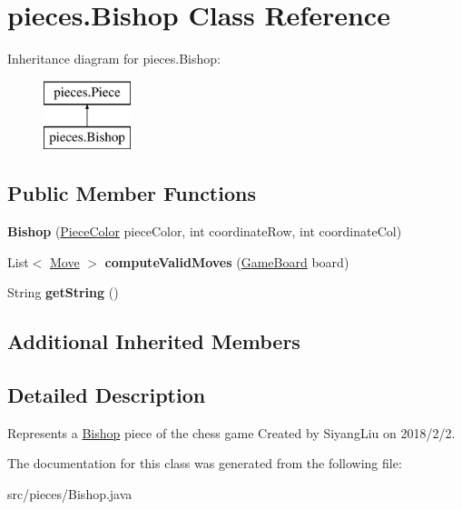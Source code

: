 \hypertarget{classpieces_1_1_bishop}{}\section{pieces.\+Bishop Class Reference}
\label{classpieces_1_1_bishop}
Inheritance diagram for pieces.\+Bishop\+:\begin{figure}[H]
\begin{center}
\leavevmode
\includegraphics[height=2.000000cm]{classpieces_1_1_bishop}
\end{center}
\end{figure}
\subsection*{Public Member Functions}
\begin{DoxyCompactItemize}
\item 
\mbox{\label{classpieces_1_1_bishop_ab1dc4c94ace53398203ed123aeb96a14}} 
{\bfseries Bishop} (\mbox{\hyperlink{enumpieces_1_1_piece_1_1_piece_color}{Piece\+Color}} piece\+Color, int coordinate\+Row, int coordinate\+Col)
\item 
\mbox{\label{classpieces_1_1_bishop_a02ba8587ac0493759c37f172a44ad20c}} 
List$<$ \mbox{\hyperlink{classpieces_1_1_move}{Move}} $>$ {\bfseries compute\+Valid\+Moves} (\mbox{\hyperlink{classgameboard_1_1_game_board}{Game\+Board}} board)
\item 
\mbox{\label{classpieces_1_1_bishop_a3fdce11e2403c4d4650928214810f567}} 
String {\bfseries get\+String} ()
\end{DoxyCompactItemize}
\subsection*{Additional Inherited Members}


\subsection{Detailed Description}
Represents a \mbox{\hyperlink{classpieces_1_1_bishop}{Bishop}} piece of the chess game Created by Siyang\+Liu on 2018/2/2. 

The documentation for this class was generated from the following file\+:\begin{DoxyCompactItemize}
\item 
src/pieces/Bishop.\+java\end{DoxyCompactItemize}
